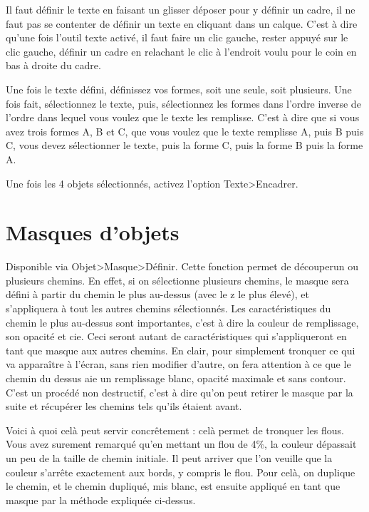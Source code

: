 \documentclass[a4paper,twoside]{article}
\begin{document}
\begin{attention}
Il faut définir le texte en faisant un glisser déposer pour y définir un cadre, il ne faut pas se contenter de définir un texte en cliquant dans un calque. C'est à dire qu'une fois l'outil texte activé, il faut faire un clic gauche, rester appuyé sur le clic gauche, définir un cadre en relachant le clic à l'endroit voulu pour le coin en bas à droite du cadre. 
\end{attention}

Une fois le texte défini, définissez vos formes, soit une seule, soit plusieurs. Une fois fait, sélectionnez le texte, puis, sélectionnez les formes dans l'ordre inverse de l'ordre dans lequel vous voulez que le texte les remplisse. C'est à dire que si vous avez trois formes A, B et C, que vous voulez que le texte remplisse A, puis B puis C, vous devez sélectionner le texte, puis la forme C, puis la forme B puis la forme A.

Une fois les 4 objets sélectionnés, activez l'option Texte>Encadrer.


\section{Masques d'objets}
Disponible via Objet>Masque>Définir. Cette fonction permet de \og découper\fg un ou plusieurs chemins. En effet, si on sélectionne plusieurs chemins, le masque sera défini à partir du chemin le plus au-dessus (avec le z le plus élevé), et s'appliquera à tout les autres chemins sélectionnés. Les caractéristiques du chemin le plus au-dessus sont importantes, c'est à dire la couleur de remplissage, son opacité et cie. Ceci seront autant de caractéristiques qui s'appliqueront en tant que masque aux autres chemins. En clair, pour simplement tronquer ce qui va apparaître à l'écran, sans rien modifier d'autre, on fera attention à ce que le chemin du dessus aie un remplissage blanc, opacité maximale et sans contour. C'est un procédé non destructif, c'est à dire qu'on peut retirer le masque par la suite et récupérer les chemins tels qu'ils étaient avant.

Voici à quoi celà peut servir concrêtement : celà permet de tronquer les flous. Vous avez surement remarqué qu'en mettant un flou de 4\%, la couleur dépassait un peu de la taille de chemin initiale. Il peut arriver que l'on veuille que la couleur s'arrête exactement aux bords, y compris le flou. Pour celà, on duplique le chemin, et le chemin dupliqué, mis blanc, est ensuite appliqué en tant que masque par la méthode expliquée ci-dessus.
\end{document}
